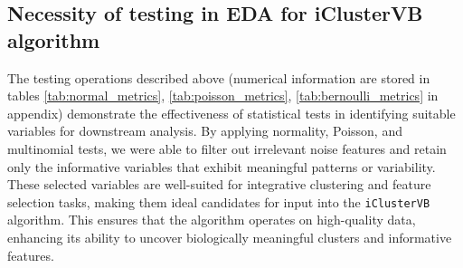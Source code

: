 \subsection{Necessity of testing in EDA for iClusterVB algorithm}

The testing operations described above (numerical information are stored in tables \ref{tab:normal_metrics}, \ref{tab:poisson_metrics}, \ref{tab:bernoulli_metrics} in appendix) demonstrate the effectiveness of statistical tests 
in identifying suitable variables for downstream analysis. By applying normality, Poisson, and multinomial tests,
we were able to filter out irrelevant noise features and retain only the informative variables that 
exhibit meaningful patterns or variability. These selected variables are well-suited for integrative clustering 
and feature selection tasks, making them ideal candidates for input into the \texttt{iClusterVB} algorithm. 
This ensures that the algorithm operates on high-quality data, enhancing its ability to uncover biologically
meaningful clusters and informative features.







